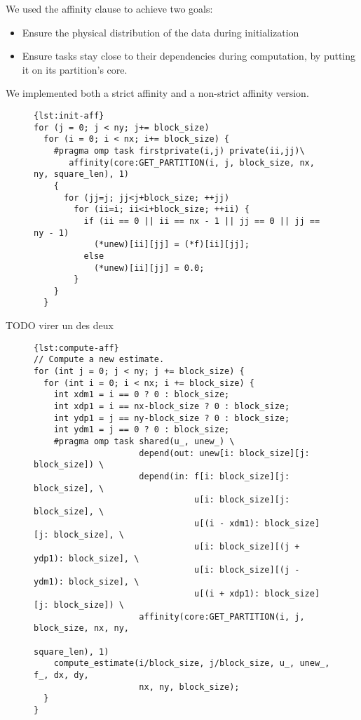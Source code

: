 \documentclass{Styles/llncs}
\begin{document}
We used the affinity clause to achieve two goals:
\begin{itemize}
    \item Ensure the physical distribution of the data during initialization
    \item Ensure tasks stay close to their dependencies during computation, by putting it on its partition's core.
\end{itemize}

We implemented both a strict affinity and a non-strict affinity version.


\begin{figure}[htbp]
\begin{lstlisting}[caption=Usage example of the affinity clause for initialization,frame=tlrb,style=smaller,label=lst:init-aff]{lst:init-aff}
for (j = 0; j < ny; j+= block_size)
  for (i = 0; i < nx; i+= block_size) {
    #pragma omp task firstprivate(i,j) private(ii,jj)\
       affinity(core:GET_PARTITION(i, j, block_size, nx, ny, square_len), 1)
    {
      for (jj=j; jj<j+block_size; ++jj)
        for (ii=i; ii<i+block_size; ++ii) {
          if (ii == 0 || ii == nx - 1 || jj == 0 || jj == ny - 1)
            (*unew)[ii][jj] = (*f)[ii][jj];
          else
            (*unew)[ii][jj] = 0.0;
        }
    }
  }
\end{lstlisting}
\end{figure}

TODO virer un des deux

\begin{figure}[htbp]
\begin{lstlisting}[caption=Usage example of the affinity clause for computation,frame=tlrb,style=smaller,label=lst:compute-aff]{lst:compute-aff}
// Compute a new estimate.
for (int j = 0; j < ny; j += block_size) {
  for (int i = 0; i < nx; i += block_size) {
    int xdm1 = i == 0 ? 0 : block_size;
    int xdp1 = i == nx-block_size ? 0 : block_size;
    int ydp1 = j == ny-block_size ? 0 : block_size;
    int ydm1 = j == 0 ? 0 : block_size;
    #pragma omp task shared(u_, unew_) \
                     depend(out: unew[i: block_size][j: block_size]) \
                     depend(in: f[i: block_size][j: block_size], \
                                u[i: block_size][j: block_size], \
                                u[(i - xdm1): block_size][j: block_size], \
                                u[i: block_size][(j + ydp1): block_size], \
                                u[i: block_size][(j - ydm1): block_size], \
                                u[(i + xdp1): block_size][j: block_size]) \
                     affinity(core:GET_PARTITION(i, j, block_size, nx, ny,
                                                 square_len), 1)
    compute_estimate(i/block_size, j/block_size, u_, unew_, f_, dx, dy,
                     nx, ny, block_size);
  }
}
\end{lstlisting}
\end{figure}
\end{document}
